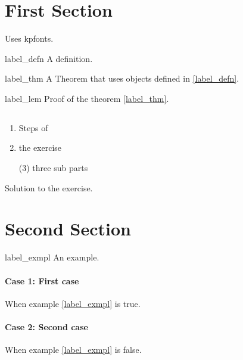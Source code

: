 \documentclass{worksheet}
\begin{document}
	\boldmath
	\maketitle
    \vspace{-1em}
	
 
	\section{First Section}
    
    Uses kpfonts.
	
	\begin{defn}{label_defn}
	A definition.
	\end{defn}


    \begin{theo}{label_thm}
	A Theorem that uses objects defined in  \ref{label_defn}. 
	\end{theo}
    
    \begin{prf}{label_lem}
    Proof of the theorem \ref{label_thm}.
    \end{prf}
    
    
    \subsection{}
    \begin{enumerate}[leftmargin=*, label=(\roman*)]
        \item Steps of
        \item the exercise
        \begin{tasks}(3)
        \task three 
        \task sub 
        \task parts
        \end{tasks}
    \end{enumerate}
    

    
    \begin{solution}
    Solution to the exercise.
    \end{solution}

    
	\section{Second Section}
	
	
	
	\begin{exmpl}[Title]{label_exmpl}
	 An example.
	\end{exmpl}
    
    \paragraph{Case 1: First case}
    When example \ref{label_exmpl} is true.
    \paragraph{Case 2: Second case}
    When example \ref{label_exmpl} is false.

	
\end{document}
